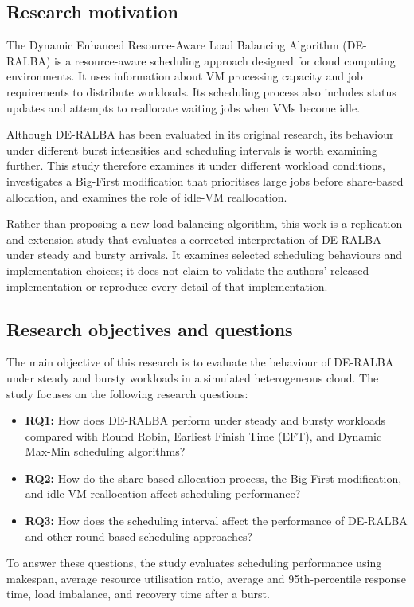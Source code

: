 \documentclass[default,sn-mathphys,Numbered]{sn-jnl}
\begin{document}
\subsection{Research motivation}
The Dynamic Enhanced Resource-Aware Load Balancing Algorithm (DE-RALBA) \cite{hussain2025deralba} is a resource-aware scheduling approach designed for cloud computing environments. It uses information about VM processing capacity and job requirements to distribute workloads. Its scheduling process also includes status updates and attempts to reallocate waiting jobs when VMs become idle.

Although DE-RALBA has been evaluated in its original research, its behaviour under different burst intensities and scheduling intervals is worth examining further. This study therefore examines it under different workload conditions, investigates a Big-First modification that prioritises large jobs before share-based allocation, and examines the role of idle-VM reallocation.

Rather than proposing a new load-balancing algorithm, this work is a replication-and-extension study that evaluates a corrected interpretation of DE-RALBA under steady and bursty arrivals. It examines selected scheduling behaviours and implementation choices; it does not claim to validate the authors' released implementation or reproduce every detail of that implementation.

\subsection{Research objectives and questions}
The main objective of this research is to evaluate the behaviour of DE-RALBA under steady and bursty workloads in a simulated heterogeneous cloud. The study focuses on the following research questions:
\begin{itemize}
    \item \textbf{RQ1:} How does DE-RALBA perform under steady and bursty workloads compared with Round Robin, Earliest Finish Time (EFT), and Dynamic Max-Min scheduling algorithms?
    \item \textbf{RQ2:} How do the share-based allocation process, the Big-First modification, and idle-VM reallocation affect scheduling performance?
    \item \textbf{RQ3:} How does the scheduling interval affect the performance of DE-RALBA and other round-based scheduling approaches?
\end{itemize}
To answer these questions, the study evaluates scheduling performance using makespan, average resource utilisation ratio, average and 95th-percentile response time, load imbalance, and recovery time after a burst.
\end{document}
